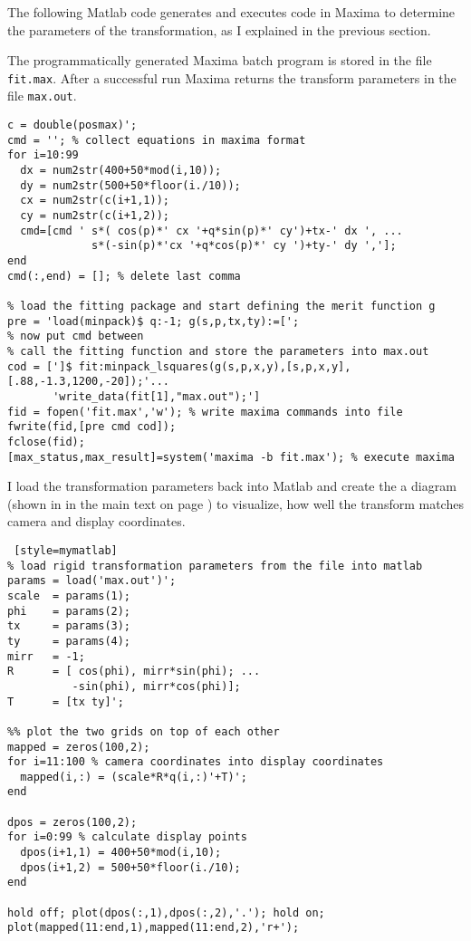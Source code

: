 The following Matlab code generates and executes code in Maxima to
determine the parameters of the transformation, as I explained in the
previous section.

The programmatically generated Maxima batch program is stored in the
file \verb!fit.max!. After a successful run Maxima returns the
transform parameters in the file \verb!max.out!.
\begin{lstlisting}[style=mymatlab]
c = double(posmax)';
cmd = ''; % collect equations in maxima format
for i=10:99 
  dx = num2str(400+50*mod(i,10));
  dy = num2str(500+50*floor(i./10));
  cx = num2str(c(i+1,1));
  cy = num2str(c(i+1,2));
  cmd=[cmd ' s*( cos(p)*' cx '+q*sin(p)*' cy')+tx-' dx ', ...
             s*(-sin(p)*'cx '+q*cos(p)*' cy ')+ty-' dy ','];
end
cmd(:,end) = []; % delete last comma

% load the fitting package and start defining the merit function g
pre = 'load(minpack)$ q:-1; g(s,p,tx,ty):=[';
% now put cmd between
% call the fitting function and store the parameters into max.out
cod = [']$ fit:minpack_lsquares(g(s,p,x,y),[s,p,x,y],[.88,-1.3,1200,-20]);'...
       'write_data(fit[1],"max.out");']
fid = fopen('fit.max','w'); % write maxima commands into file
fwrite(fid,[pre cmd cod]);
fclose(fid);
[max_status,max_result]=system('maxima -b fit.max'); % execute maxima
\end{lstlisting}
I load the transformation parameters back into Matlab and create the a
diagram (shown in  in the main text on page
\pageref{fig:rigid-compare}) to visualize, how well the transform
matches camera and display coordinates.
\begin{lstlisting} [style=mymatlab]
% load rigid transformation parameters from the file into matlab
params = load('max.out')';
scale  = params(1);
phi    = params(2);
tx     = params(3);
ty     = params(4);
mirr   = -1;
R      = [ cos(phi), mirr*sin(phi); ...
          -sin(phi), mirr*cos(phi)];
T      = [tx ty]';

%% plot the two grids on top of each other
mapped = zeros(100,2);
for i=11:100 % camera coordinates into display coordinates
  mapped(i,:) = (scale*R*q(i,:)'+T)';
end

dpos = zeros(100,2);
for i=0:99 % calculate display points
  dpos(i+1,1) = 400+50*mod(i,10);
  dpos(i+1,2) = 500+50*floor(i./10);
end

hold off; plot(dpos(:,1),dpos(:,2),'.'); hold on;
plot(mapped(11:end,1),mapped(11:end,2),'r+');
\end{lstlisting}


